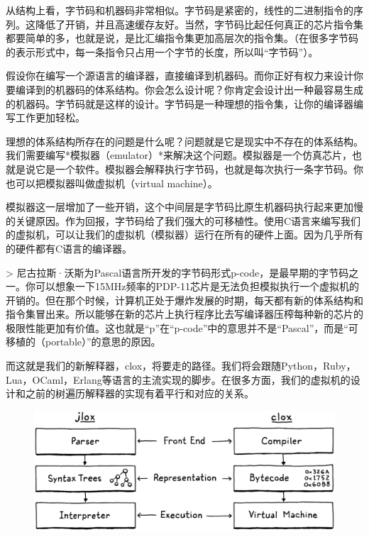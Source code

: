 \documentclass[cn,10pt,math=newtx,citestyle=gb7714-2015,bibstyle=gb7714-2015]{elegantbook}
\begin{document}
从结构上看，字节码和机器码非常相似。字节码是紧密的，线性的二进制指令的序列。这降低了开销，并且高速缓存友好。当然，字节码比起任何真正的芯片指令集都要简单的多，也就是说，是比汇编指令集更加高层次的指令集。（在很多字节码的表示形式中，每一条指令只占用一个字节的长度，所以叫“字节码”）。

假设你在编写一个源语言的编译器，直接编译到机器码。而你正好有权力来设计你要编译到的机器码的体系结构。你会怎么设计呢？你肯定会设计出一种最容易生成的机器码。字节码就是这样的设计。字节码是一种理想的指令集，让你的编译器编写工作更加轻松。

理想的体系结构所存在的问题是什么呢？问题就是它是现实中不存在的体系结构。我们需要编写*模拟器（emulator）*来解决这个问题。模拟器是一个仿真芯片，也就是说它是一个软件。模拟器会解释执行字节码，也就是每次执行一条字节码。你也可以把模拟器叫做虚拟机（virtual machine）。

模拟器这一层增加了一些开销，这个中间层是字节码比原生机器码执行起来更加慢的关键原因。作为回报，字节码给了我们强大的可移植性。使用C语言来编写我们的虚拟机，可以让我们的虚拟机（模拟器）运行在所有的硬件上面。因为几乎所有的硬件都有C语言的编译器。

> 尼古拉斯·沃斯为Pascal语言所开发的字节码形式p-code，是最早期的字节码之一。你可以想象一下15MHz频率的PDP-11芯片是无法负担模拟执行一个虚拟机的开销的。但在那个时候，计算机正处于爆炸发展的时期，每天都有新的体系结构和指令集冒出来。所以能够在新的芯片上执行程序比去写编译器压榨每种新的芯片的极限性能更加有价值。这也就是“p”在“p-code”中的意思并不是“Pascal”，而是“可移植的（portable）”的意思的原因。

而这就是我们的新解释器，clox，将要走的路径。我们将会跟随Python，Ruby，Lua，OCaml，Erlang等语言的主流实现的脚步。在很多方面，我们的虚拟机的设计和之前的树遍历解释器的实现有着平行和对应的关系。

\begin{figure}[h]
\centering
\includegraphics[width=\textwidth]{image/chunks-of-bytecode/phases.png}
\end{figure}
\end{document}

